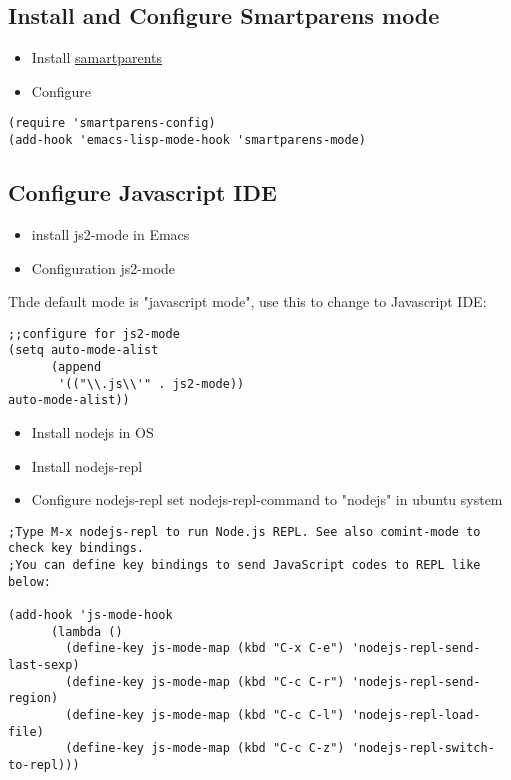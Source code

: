 \documentclass[11pt]{article}
\begin{document}
\subsection{Install and Configure Smartparens mode}
\label{sec:orgc3631cc}
\begin{itemize}
\item Install
\href{https://github.com/Fuco1/smartparens\#getting-started}{samartparents}
\item Configure
\end{itemize}
\begin{verbatim}
(require 'smartparens-config)
(add-hook 'emacs-lisp-mode-hook 'smartparens-mode)
\end{verbatim}
\subsection{Configure Javascript IDE}
\label{sec:org7a7ca8e}
\begin{itemize}
\item install js2-mode in Emacs
\item Configuration js2-mode
\end{itemize}
Thde default mode is "javascript mode", use this to change to Javascript IDE:
\begin{verbatim}
;;configure for js2-mode
(setq auto-mode-alist
      (append
       '(("\\.js\\'" . js2-mode))
auto-mode-alist))
\end{verbatim}
\begin{itemize}
\item Install nodejs in OS
\item Install nodejs-repl
\item Configure nodejs-repl
set nodejs-repl-command to "nodejs" in ubuntu system
\end{itemize}
\begin{verbatim}
;Type M-x nodejs-repl to run Node.js REPL. See also comint-mode to check key bindings.
;You can define key bindings to send JavaScript codes to REPL like below:

(add-hook 'js-mode-hook
	  (lambda ()
	    (define-key js-mode-map (kbd "C-x C-e") 'nodejs-repl-send-last-sexp)
	    (define-key js-mode-map (kbd "C-c C-r") 'nodejs-repl-send-region)
	    (define-key js-mode-map (kbd "C-c C-l") 'nodejs-repl-load-file)
	    (define-key js-mode-map (kbd "C-c C-z") 'nodejs-repl-switch-to-repl)))	    

\end{verbatim}
\end{document}
